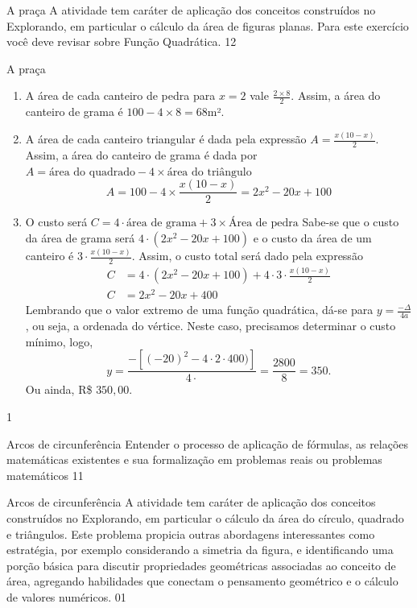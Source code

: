 \begin{sugestions}{A praça}
{
  A atividade tem caráter de aplicação dos conceitos construídos no Explorando, em particular o cálculo da área de figuras planas. Para este exercício você deve revisar sobre Função Quadrática.
}{1}{2}
\end{sugestions}
\begin{answer}{A praça}
{
\begin{enumerate}
\item A área de cada canteiro de pedra para $x=2$ vale $\frac{2\times8}{2}$. Assim, a área do canteiro de grama é  $100-4\times8=68$m². 
  
\item A área de cada canteiro triangular é dada pela expressão $A=\frac{x(10-x)}{2}$. Assim, a área do canteiro de grama é dada por $A=\text{área do quadrado}-4\times\text{área do triângulo}$
\begin{equation*}
A= 100-4\times\frac{x(10-x)}{2}=2x^2-20x+100
\end{equation*}
\item  O custo será $C=4\cdot\text{área de grama} + 3\times\text{Área de pedra}$
Sabe-se que o custo da área de grama será $4\cdot(2x^2-20x+100)$  e o custo da área de um canteiro é $3\cdot\frac{x(10-x)}{2}$. Assim, o custo total será dado pela expressão  
\begin{align*}
C&=4\cdot(2x^2-20x+100)+4\cdot3\cdot\frac{x(10-x)}{2}\\
C&=2x^2-20x+400
\end{align*}
Lembrando que o valor extremo de uma função quadrática, dá-se para $y=\frac{-\Delta}{4a}$, ou seja, a ordenada do vértice.  Neste caso, precisamos determinar o custo mínimo, logo, 
\begin{equation*}
y=\frac{-[(-20)^2-4\cdot2\cdot400)]}{4\cdot}=\frac{2800}{8}=350. 
\end{equation*}
Ou ainda, R\$ $350{,}00$.
\end{enumerate}
}{1}
\end{answer}
\begin{objectives}{Arcos de circunferência}
{
  Entender o processo de aplicação de fórmulas, as relações matemáticas existentes e sua formalização em problemas reais ou problemas matemáticos
}{1}{1}
\end{objectives}
\begin{sugestions}{Arcos de circunferência}
{
  A atividade tem caráter de aplicação dos conceitos construídos no Explorando, em particular o cálculo da área do círculo, quadrado e triângulos. Este problema propicia outras abordagens interessantes como estratégia, por exemplo considerando a simetria da figura, e identificando uma porção básica para discutir propriedades geométricas associadas ao conceito de área, agregando habilidades que conectam o pensamento geométrico e o cálculo de valores numéricos. 
}{0}{1}
\end{sugestions}
